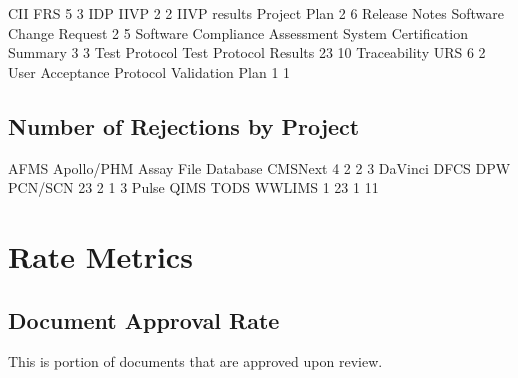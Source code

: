 \documentclass{article}
\begin{document}
\begin{Schunk}
\begin{Soutput}
                           CII                            FRS 
                             5                              3 
                           IDP                           IIVP 
                             2                              2 
                  IIVP results                   Project Plan 
                             2                              6 
                 Release Notes        Software Change Request 
                             2                              5 
Software Compliance Assessment   System Certification Summary 
                             3                              3 
                 Test Protocol          Test Protocol Results 
                            23                             10 
                  Traceability                            URS 
                             6                              2 
      User Acceptance Protocol                Validation Plan 
                             1                              1 
\end{Soutput}
\end{Schunk}

\subsection{Number of Rejections by Project}

\begin{Schunk}
\begin{Soutput}
               AFMS          Apollo/PHM Assay File Database             CMSNext 
                  4                   2                   2                   3 
            DaVinci                DFCS                 DPW             PCN/SCN 
                 23                   2                   1                   3 
              Pulse                QIMS                TODS              WWLIMS 
                  1                  23                   1                  11 
\end{Soutput}
\end{Schunk}



\section{Rate Metrics}
\subsection{Document Approval Rate}
This is portion of documents that are approved upon review.
\end{document}
